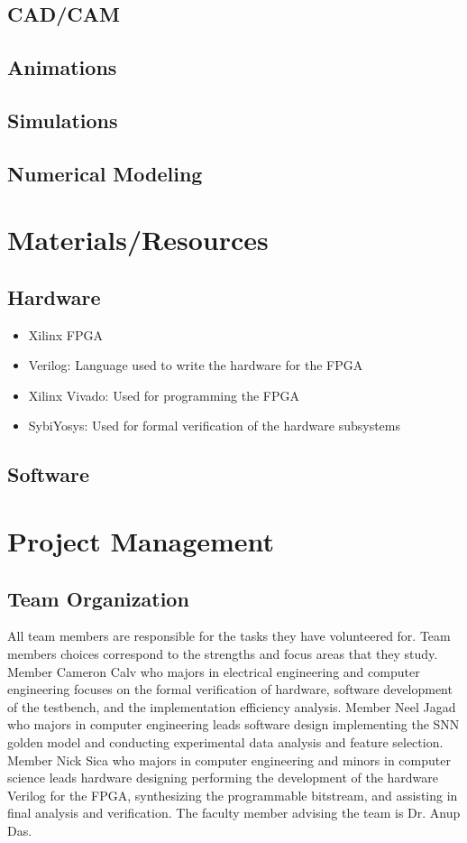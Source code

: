 \documentclass[12pt,titlepage]{article}
\begin{document}
\subsection{CAD/CAM}
\subsection{Animations}
\subsection{Simulations}
\subsection{Numerical Modeling}

\section{Materials/Resources}
\subsection{Hardware}
\begin{itemize}
	\item Xilinx FPGA
	\item Verilog: Language used to write the hardware for the FPGA
	\item Xilinx Vivado: Used for programming the FPGA
	\item SybiYosys: Used for formal verification of the hardware subsystems
\end{itemize}
\subsection{Software}


\section{Project Management}
\subsection{Team Organization}
All team members are responsible for the tasks they have volunteered for. Team members choices correspond to the strengths and focus areas that they study.
Member Cameron Calv who majors in electrical engineering and computer engineering focuses on the formal verification of hardware, software development of
the testbench, and the implementation efficiency analysis. Member Neel Jagad who majors in computer engineering leads software design implementing the SNN
golden model and conducting experimental data analysis and feature selection. Member Nick Sica who majors in computer engineering and minors in computer
science leads hardware designing performing the development of the hardware Verilog for the FPGA, synthesizing the programmable bitstream, and assisting in
final analysis and verification. The faculty member advising the team is Dr. Anup Das. 
\end{document}
